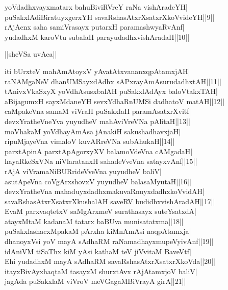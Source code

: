 \documentclass{article}
\begin{document}
yoVdadhxvayxmatarx bahuBiviRVreY raNa vishAradeYH|\\
puSakxlAdiBiratuyxgerxYH savaRshasAtxrXsatxrXkoVvideYH||9||\\
rAjAcnx saha samiVrasayx putarxH paramashwyaRvAnf|\\
yudadhxM karoVtu subalaH parayudadhxvishAradaH||10||\\

\begin{center}
||sheVSa uvAca||
\end{center}

iti bUrxteV mahAmAtoyxV yAvatAtxvananxqpAtamxjAH|\\
raNAMgaNeV dhanUMSayxdAdhx sAPxrayAmAsurudadhxtAH||11||\\
tAnivxVkaSxyX yoVdhAsusxbalAH puSakxlAdAyx baloVtakxTAH|\\
aBijagumxH sayxMdaneYH sevxYdhaRnUMSi dadhatoV matAH||12||\\
caMpakeVna samaM viVraH puSakxlaH paramAsatxrXvitf|\\
devxYratheVneYva yuyudheV mahAviVreVNa pAlitaH||13||\\
moVhakaM yoVdhayAmAsa jAnakiH sakushadhavxjaH|\\
ripuMjayeVna vimaloV kuvARreVNa subAhukaH||14||\\
parxtApinA parxtApAgorxyXV balamoVdeVna cAMgadaH|\\
hayaRkeSxVNa niVlaratanxH sahadeVveVna satayxvAnf||15||\\
rAjA viVramaNiBURrideVveVna yuyudheV baliV|\\
asutApeVna coVgArxshovxV yuyudheV balasaMyutaH||16||\\
devxYratheVna mahaduyxdadhxmakuvaRnuyxdadhxkoVvidAH|\\
savaRshasAtxrXsatxrXkushalAH saveRV budidhxvishAradAH||17||\\
EvaM parxvaqtetxV saMgArxmeV surathasayx suteYsatxdA|\\
atayxMtaM kadanaM tatarx baBUva munisatatxma||18||\\
puSakxlashacxMpakaM pArxha kiMnAmAsi naqpAtamxja|\\
dhanoyxVsi yoV mayA sAdhaRM raNamadhayxmupeVyivAnf||19||\\
idAniVM tiSaThx kiM yAsi kathaM teV jiVvitaM BaveVtf|\\
Ehi yudadhxM mayA sAdhaRM savaRshasAtxrXsatxrXkoVda||20||\\
itayxBivAyxhaqtaM tasayxM shurxtAvx rAjAtamxjoV baliV|\\
jagAda puSakxlaM viVroV meVGagaMBiVrayA girA||21||\\
\end{document}
